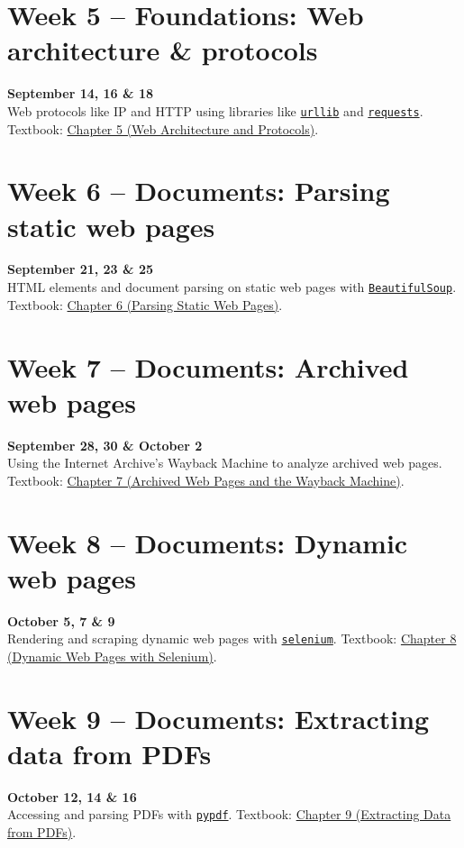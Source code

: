 \documentclass[11pt]{memoir}
\def\bookurl{https://github.com/cuinfoscience/Web-Data-Science-Book}
\begin{document}
\section{Week 5 -- Foundations: Web architecture \& protocols}
\textcolor{CUGold}{\textbf{September 14, 16 \& 18}}\\
Web protocols like IP and HTTP using libraries like \href{https://docs.python.org/3/library/urllib.html}{\texttt{urllib}} and \href{https://requests.readthedocs.io/}{\texttt{requests}}. Textbook: \href{\bookurl/blob/main/ch-05-protocols.qmd}{Chapter 5 (Web Architecture and Protocols)}.

\section{Week 6 -- Documents: Parsing static web pages}
\textcolor{CUGold}{\textbf{September 21, 23 \& 25}}\\
HTML elements and document parsing on static web pages with \href{https://www.crummy.com/software/BeautifulSoup/bs4/doc/}{\texttt{BeautifulSoup}}. Textbook: \href{\bookurl/blob/main/ch-06-static-pages.qmd}{Chapter 6 (Parsing Static Web Pages)}.

\section{Week 7 -- Documents: Archived web pages}
\textcolor{CUGold}{\textbf{September 28, 30 \& October 2}}\\
Using the Internet Archive's Wayback Machine to analyze archived web pages. Textbook: \href{\bookurl/blob/main/ch-07-archives.qmd}{Chapter 7 (Archived Web Pages and the Wayback Machine)}.

\section{Week 8 -- Documents: Dynamic web pages}
\textcolor{CUGold}{\textbf{October 5, 7 \& 9}}\\
Rendering and scraping dynamic web pages with \href{https://selenium-python.readthedocs.io/}{\texttt{selenium}}. Textbook: \href{\bookurl/blob/main/ch-08-dynamic-pages.qmd}{Chapter 8 (Dynamic Web Pages with Selenium)}.

\section{Week 9 -- Documents: Extracting data from PDFs}
\textcolor{CUGold}{\textbf{October 12, 14 \& 16}}\\
Accessing and parsing PDFs with \href{https://pypdf.readthedocs.io/}{\texttt{pypdf}}. Textbook: \href{\bookurl/blob/main/ch-09-pdfs.qmd}{Chapter 9 (Extracting Data from PDFs)}.
\end{document}
